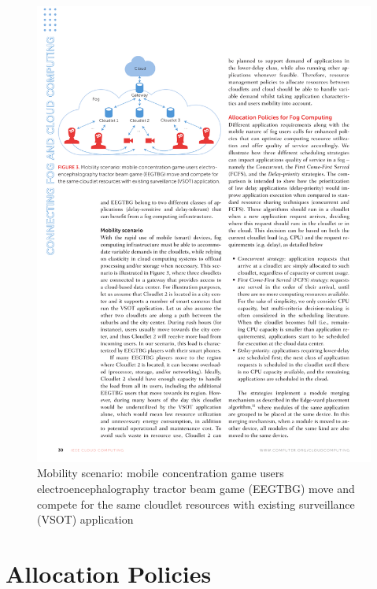 \documentclass[10pt, pdf, xcolor=pdftex, dvipsnames, table]{beamer}
\begin{document}
\begin{frame}
 	\begin{figure}[htbp]
 		\centerline{\includegraphics[scale=0.9]{images/mobility.pdf}}
 		\caption[Mobility scenario: mobile concentration game users electroencephalography tractor beam game (EEGTBG) move and compete for the same cloudlet resources with existing surveillance (VSOT) application]{Mobility scenario: mobile concentration game users electroencephalography tractor beam game (EEGTBG) move and compete for the same cloudlet resources with existing surveillance (VSOT) application}
 	\end{figure}
\end{frame}

\section[Allocation Policies]{Allocation Policies}
\end{document}
